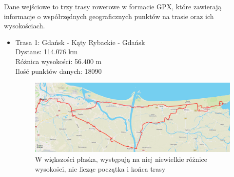 \documentclass{article}
\begin{document}
Dane wejściowe to trzy trasy rowerowe w formacie GPX,
które zawierają informacje o współrzędnych geograficznych punktów na 
trasie oraz ich wysokościach.
\begin{itemize}
    \item Trasa 1: Gdańsk - Kąty Rybackie - Gdańsk \\
    Dystans: 114.076 km \\
    Różnica wysokości: 56.400 m \\
    Ilość punktów danych: 18090
    \begin{figure}[H]
        \centering
        \includegraphics[width=\textwidth]{routes/katy_rybackie.png}
        \caption*{W większości płaska, występują na niej niewielkie 
        różnice wysokości, nie licząc początka i końca trasy}
    \end{figure}
\end{itemize}
\end{document}
